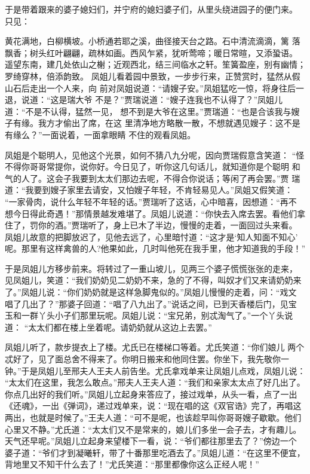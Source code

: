 于是带着跟来的婆子媳妇们，并宁府的媳妇婆子们，从里头绕进园子的便门来。
只见：

黄花满地，白柳横坡。小桥通若耶之溪，曲径接天台之路。石中清流滴滴，篱
落飘香；树头红叶翩翩，疏林如画。西风乍紧，犹听莺啼；暖日常暄，又添蛩语。
遥望东南，建几处依山之榭；近观西北，结三间临水之轩。笙簧盈座，别有幽情；
罗绮穿林，倍添韵致。
凤姐儿看着园中景致，一步步行来，正赞赏时，猛然从假山石后走出一个人来，向
前对凤姐说道：“请嫂子安。”凤姐猛吃一惊，将身往后一退，说道：“这是瑞大爷
不是？”贾瑞说道：“嫂子连我也不认得了？”凤姐儿道：“不是不认得，猛然一见，
想不到是大爷在这里。”贾瑞道：“也是合该我与嫂子有缘。我方才偷出了席，在这
里清净地方略散一散，不想就遇见嫂子：这不是有缘么？”一面说着，一面拿眼睛
不住的观看凤姐。

凤姐是个聪明人，见他这个光景，如何不猜八九分呢，因向贾瑞假意含笑道：
“怪不得你哥哥常提你，说你好。今日见了，听你这几句话儿，就知道你是个聪明
和气的人了。这会子我要到太太们那边去呢，不得合你说话；等闲了再会罢。”贾
瑞道：“我要到嫂子家里去请安，又怕嫂子年轻，不肯轻易见人。”凤姐又假笑道：
“一家骨肉，说什么年轻不年轻的话。”贾瑞听了这话，心中暗喜，因想道：“再不
想今日得此奇遇！”那情景越发难堪了。凤姐儿说道：“你快去入席去罢。看他们拿
住了，罚你的酒。”贾瑞听了，身上已木了半边，慢慢的走着，一面回过头来看。
凤姐儿故意的把脚放迟了，见他去远了，心里暗忖道：“这才是‘知人知面不知心’
呢。那里有这样禽兽的人?他果如此，几时叫他死在我手里，他才知道我的手段！”

于是凤姐儿方移步前来。将转过了一重山坡儿，见两三个婆子慌慌张张的走来，
见凤姐儿，笑道：“我们奶奶见二奶奶不来，急的了不得，叫奴才们又来请奶奶来
了。”凤姐儿说：“你们奶奶就是这样急脚鬼似的。”凤姐儿慢慢的走着，问：“戏文
唱了几出了？”那婆子回道：“唱了八九出了。”说话之间，已到天香楼后门，见宝
玉和一群丫头小子们那里玩呢。凤姐儿说：“宝兄弟，别忒淘气了。”一个丫头说道：
“太太们都在楼上坐着呢。请奶奶就从这边上去罢。”

凤姐儿听了，款步提衣上了楼。尤氏已在楼梯口等着。尤氏笑道：“你们娘儿
两个忒好了，见了面总舍不得来了。你明日搬来和他同住罢。你坐下，我先敬你一
钟。”于是凤姐儿至邢夫人王夫人前告坐。尤氏拿戏单来让凤姐儿点戏，凤姐儿说：
“太太们在这里，我怎么敢点。”邢夫人王夫人道：“我们和亲家太太点了好几出了。
你点几出好的我们听。”凤姐儿立起身来答应了，接过戏单，从头一看，点了一出
《还魂》，一出《弹词》，递过戏单来，说：“现在唱的这《双官诰》完了，再唱这
两出，也就是时候了。”王夫人道：“可不是呢，也该趁早叫你哥哥嫂子歇歇。他们
心里又不静。”尤氏道：“太太们又不是常来的，娘儿们多坐一会子去，才有趣儿。
天气还早呢。”凤姐儿立起身来望楼下一看，说：“爷们都往那里去了？”傍边一个
婆子道：“爷们才到凝曦轩，带了十番那里吃酒去了。”凤姐儿道：“在这里不便宜，
背地里又不知干什么去了！”尤氏笑道：“那里都像你这么正经人呢！”

